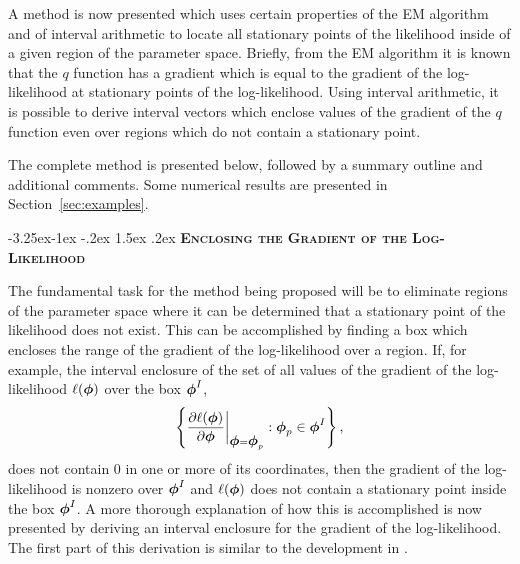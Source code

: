 \documentclass[10pt,twoside]{article}
\makeatletter
\renewcommand\subsection{\@startsection{subsection}{2}{\z@}%
                 {-3.25ex\@plus -1ex \@minus -.2ex}%
                 {1.5ex \@plus .2ex}%
                 {\scshape\centering\bfseries}} %
\makeatother
\begin{document}
A method is now presented which uses certain properties of the EM
algorithm and of interval arithmetic to locate all stationary points of
the likelihood inside of a given region of the parameter space.
Briefly, from the EM algorithm it is known that the $q$
function has a gradient which is equal to the gradient of the
log-likelihood at stationary points of the log-likelihood.  Using
interval arithmetic, it is possible to derive interval vectors which 
enclose values of the
gradient of the $q$ function even over regions which do not contain
a stationary point.

The complete method is presented below,
followed by a summary outline and additional comments.  
Some numerical results are presented in
Section~\ref{sec:examples}.

\subsection{\textsc \bf Enclosing the Gradient of the Log-Likelihood}

The fundamental task for the 
method being proposed will be to eliminate regions of the parameter
space where it can be determined that a stationary point of the likelihood
does not exist.  This can be accomplished by finding a box which encloses
the
range of the gradient of the
log-likelihood over a region.  
If, for example, the interval enclosure of the set of all values of the
gradient of the log-likelihood $\ell(\mbox{\boldmath $\phi$})$ over the box $\mbox{\boldmath $\phi$}^I$,
$$
\left\{ \frac{\partial\ell(\mbox{\boldmath $\phi$})}{\partial\mbox{\boldmath $\phi$}} 
  \bigg|_{\mbox{\boldmath $\phi$} = \mbox{\boldmath $\phi$}_p} : \mbox{\boldmath $\phi$}_p \in \mbox{\boldmath $\phi$}^I \right\},
$$
does not contain $0$ in one or more of its coordinates,
then the gradient of the log-likelihood is nonzero over $\mbox{\boldmath $\phi$}^I$ and 
$\ell(\mbox{\boldmath $\phi$})$ does not contain a stationary point
inside the box $\mbox{\boldmath $\phi$}^I$.
A more thorough explanation of how this is
accomplished is now presented by deriving an interval
enclosure for the gradient of the
log-likelihood.  The first part of this derivation is similar to the
development in \cite{DLR}.
\end{document}
